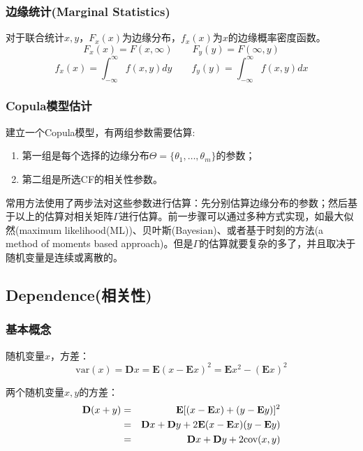 \subsubsection{边缘统计(Marginal Statistics)}
对于联合统计$x,y$，$F_x(x)$为边缘分布，$f_x(x)$为$x$的边缘概率密度函数。
\begin{equation}
    F_x(x) = F(x,\infty) \qquad F_y(y) = F(\infty,y)
    \label{eq0.1}
\end{equation}
\begin{equation}
    f_x(x) = \int_{-\infty}^{\infty} f(x,y) dy \qquad f_y(y) = \int_{-\infty}^{\infty} f(x,y) dx
    \label{eq0.2}
\end{equation}
\subsubsection{Copula模型估计}
建立一个Copula模型，有两组参数需要估算\cite{Smith2009}:
\begin{enumerate}
    \item 第一组是每个选择的边缘分布$\Theta = \{\theta_1,\dots,\theta_m\}$的参数；
    \item 第二组是所选CF的相关性参数。
\end{enumerate}
常用方法使用了两步法对这些参数进行估算：先分别估算边缘分布的参数；然后基于以上的估算对相关矩阵$\Gamma$进行估算。前一步骤可以通过多种方式实现，如最大似然(maximum likelihood(ML))、贝叶斯(Bayesian)、或者基于时刻的方法(a method of moments based approach)。但是$\Gamma$的估算就要复杂的多了，并且取决于随机变量是连续或离散的。

\subsection{Dependence(相关性)}
\subsubsection{基本概念}
随机变量$x$，方差：
\begin{equation}
    \text{var}(x) = \mathbf{D}x = \mathbf{E}(x-\mathbf{E}x)^2 = \mathbf{E}x^2-(\mathbf{E}x)^2
    \label{eq-var}
\end{equation}

两个随机变量$x,y$的方差：
\begin{eqnarray}
    \mathbf{D}(x+y) &=& \mathbf{E}[(x-\mathbf{E}x) + (y-\mathbf{E}y)]^2 \notag \\
    &=&\mathbf{D}x+\mathbf{D}y+2\mathbf{E}(x-\mathbf{E}x)(y-\mathbf{E}y) \notag \\
    &=&\mathbf{D}x+\mathbf{D}y+2\text{cov}(x,y)
    \label{eq-cov-var}
\end{eqnarray}

